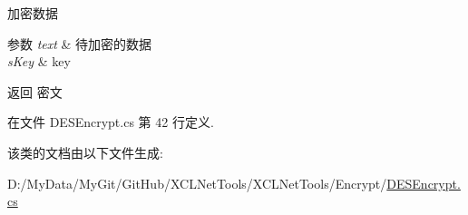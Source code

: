 加密数据 


\begin{DoxyParams}{参数}
{\em text} & 待加密的数据\\
\hline
{\em s\-Key} & key\\
\hline
\end{DoxyParams}
\begin{DoxyReturn}{返回}
密文
\end{DoxyReturn}


在文件 D\-E\-S\-Encrypt.\-cs 第 42 行定义.



该类的文档由以下文件生成\-:\begin{DoxyCompactItemize}
\item 
D\-:/\-My\-Data/\-My\-Git/\-Git\-Hub/\-X\-C\-L\-Net\-Tools/\-X\-C\-L\-Net\-Tools/\-Encrypt/\hyperlink{_d_e_s_encrypt_8cs}{D\-E\-S\-Encrypt.\-cs}\end{DoxyCompactItemize}

